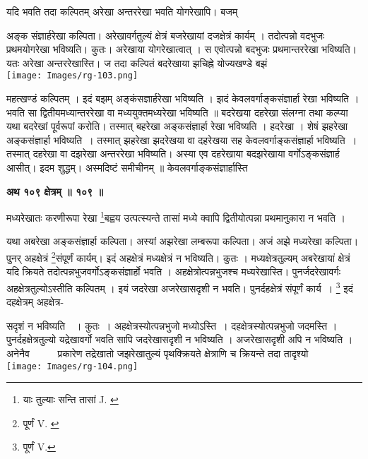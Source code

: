 \documentclass[11pt, openany]{book}
\begin{document}
यदि भवति तदा कल्पितम् अरेखा अन्तररेखा भवति योगरेखापि। बजम् 
\begin{vwcol}[widths={0.6,0.4}, sep=.8cm, rule=0pt]
अङ्क संज्ञार्हरेखा कल्पिता। अरेखावर्गतुल्यं क्षेत्रं बजरेखायां दजक्षेत्रं कार्यम् । तदोत्पन्नो वदभुजः प्रथमयोगरेखा भविष्यति। कुतः। अरेखाया योगरेखात्वात् । स एवोत्पन्नो बदभुजः प्रथमान्तररेखा भविष्यति। यतः अरेखा अन्तररेखास्ति। ज
तदा कल्पितं बदरेखाया झचिह्ने योज्यखण्डे बझं  \\
\noindent \texttt{[image: Images/rg-103.png]}
\end{vwcol}
\noindent महत्खण्डं कल्पितम् । इदं बझम् अङ्कंसज्ञार्हरेखा भविष्यति । झदं  केवलवर्गाङ्कसंज्ञार्हा रेखा भविष्यति । भवति सा द्वितीयमध्यान्तररेखा वा मध्ययुक्तमध्यरेखा भविष्यति ॥ बदरेखया दहरेखा संलग्ना तथा कल्प्या यथा बदरेखां पूर्वरूपां करोति। तस्मात् बहरेखा अङ्कसंज्ञार्हा रेखा भविष्यति । हदरेखा । शेषं झहरेखा अङ्कसंज्ञार्हा
भविष्यति~। तस्मात् झहरेखा झदरेखया वा दहरेखया सह
केवलवर्गाङ्कसंज्ञार्हा भविष्यति~। तस्मात् दहरेखा वा दझरेखा अन्तररेखा भविष्यति।
अस्या एव दहरेखाया बदझरेखाया वर्गोऽङ्कसंज्ञार्ह आसीत्। इदम
शुद्धम्। अस्मदिष्टं समीचीनम् ॥
केवलवर्गाङ्कसंज्ञार्हास्ति

\newpage
\begin{center}
\textbf{\large अथ १०९ क्षेत्रम् ॥ १०९ ॥}
\end{center}
\vspace{2mm}

{\ab मध्यरेखातः करणीरूपा रेखा \renewcommand{\thefootnote}{१}\footnote{याः तुल्याः सन्ति तासां {\en J. }}बह्वय उत्पत्स्यन्ते तासां
मध्ये क्वापि द्वितीयोत्पन्ना प्रथमानुकारा न भवति ।}\\
\vspace{3mm}

यथा अबरेखा अङ्कसंज्ञार्हा कल्पिता। अस्यां अझरेखा लम्बरूपा
कल्पिता। अजं अझे मध्यरेखा कल्पिता। पुनर् अहक्षेत्रं \renewcommand{\thefootnote}{२}\footnote{पूर्णं {\en V. }}संपूर्णं 
कार्यम्। इदं अहक्षेत्रं मध्यक्षेत्रं न  भविष्यति। कुतः । 
मध्यक्षेत्रतुल्यम् अबरेखायां क्षेत्रं यदि क्रियते तदोत्पन्नभुजवर्गोऽङ्कसंज्ञार्हो भवति । अहक्षेत्रोत्पन्नभुजश्च मध्यरेखास्ति। पुनर्जदरेखावर्गः अहक्षेत्रतुल्योऽस्तीति कल्पितम् । इयं जदरेखा अजरेखासदृशी न भवति।
पुनर्दहक्षेत्रं संपूर्णं कार्य~। 
\renewcommand{\thefootnote}{३}\footnote{पूर्णं {\en V.}} इदं दहक्षेत्रम् अहक्षेत्र-
\begin{vwcol}[widths={0.56,0.44}, sep=.8cm, rule=0pt]
सदृशं न भविष्यति ~। कुतः~। अहक्षेत्रस्योत्पन्नभुजो मध्योऽस्ति~।
दहक्षेत्रस्योत्पन्नभुजो जदमस्ति । पुनर्दहक्षेत्रतुल्यो यद्रेखावर्गो भवति सापि
जदरेखासदृशी न भविष्यति । अजरेखासदृशी अपि न भविष्यति ।
अनेनैव ~~~~~प्रकारेण तद्रेखातो जझरेखातुल्यं पृथक्क्रियते क्षेत्राणि च
क्रियन्ते तदा तादृश्यो \\

\noindent \texttt{[image: Images/rg-104.png]}
\end{vwcol}
\vspace{-1mm}
\end{document}
